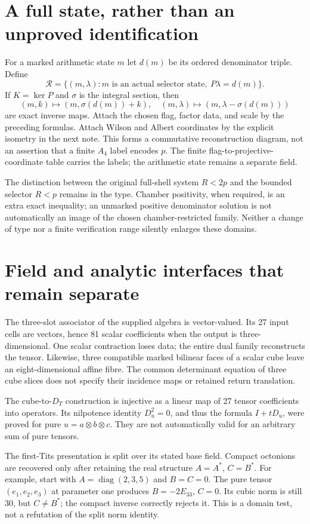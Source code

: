 \section{A full state, rather than an unproved identification}
For a marked arithmetic state $m$ let $d(m)$ be its ordered denominator triple. Define
\[
\mathscr R=\{(m,\lambda):m\text{ is an actual selector state},\ P\lambda=d(m)\}.
\]
If $K=\ker P$ and $\sigma$ is the integral section, then
\[
(m,k)\mapsto(m,\sigma(d(m))+k),\quad
(m,\lambda)\mapsto(m,\lambda-\sigma(d(m)))
\]
are exact inverse maps. Attach the chosen flag, factor data, and scale by the preceding formulas. Attach Wilson and Albert coordinates by the explicit isometry in the next note. This forms a commutative reconstruction diagram, not an assertion that a finite $A_4$ label encodes $p$. The finite flag-to-projective-coordinate table carries the labels; the arithmetic state remains a separate field.

The distinction between the original full-shell system $R<2p$ and the bounded selector $R<p$ remains in the type. Chamber positivity, when required, is an extra exact inequality; an unmarked positive denominator solution is not automatically an image of the chosen chamber-restricted family. Neither a change of type nor a finite verification range silently enlarges these domains.

\section{Field and analytic interfaces that remain separate}
The three-slot associator of the supplied algebra is vector-valued. Its 27 input cells are vectors, hence 81 scalar coefficients when the output is three-dimensional. One scalar contraction loses data; the entire dual family reconstructs the tensor. Likewise, three compatible marked bilinear faces of a scalar cube leave an eight-dimensional affine fibre. The common determinant equation of three cube slices does not specify their incidence maps or retained return translation.

The cube-to-$D_T$ construction is injective as a linear map of 27 tensor coefficients into operators. Its nilpotence identity $D_u^2=0$, and thus the formula $I+tD_u$, were proved for pure $u=a\otimes b\otimes c$. They are not automatically valid for an arbitrary sum of pure tensors.

The first-Tits presentation is split over its stated base field. Compact octonions are recovered only after retaining the real structure $A=A^*$, $C=B^*$. For example, start with $A=\operatorname{diag}(2,3,5)$ and $B=C=0$. The pure tensor $(e_1,e_2,e_3)$ at parameter one produces $B=-2E_{33}$, $C=0$. Its cubic norm is still 30, but $C\ne B^*$; the compact inverse correctly rejects it. This is a domain test, not a refutation of the split norm identity.

